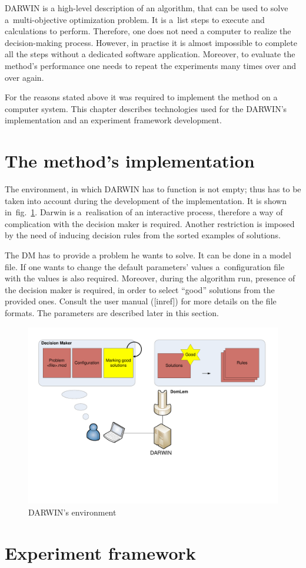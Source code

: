DARWIN is a high-level description of an algorithm, that can be used to solve
a~multi-objective optimization problem. It is a~list steps to execute and
calculations to perform. Therefore, one does not need a computer to realize
the decision-making process. However, in practise it is almost impossible to
complete all the steps without a dedicated software application. Moreover, to
evaluate the method's performance one needs to repeat the experiments many
times over and over again.

For the reasons stated above it was required to implement the method on a
computer system. This chapter describes technologies used for the DARWIN's
implementation and an experiment framework development.

\section{The method's implementation}

The environment, in which DARWIN has to function is not empty; thus has to be
taken into account during the development of the implementation. It is shown
in~fig.~\ref{environ}. Darwin is a~realisation of an interactive process,
therefore a way of complication with the decision maker is required. Another
restriction is imposed by the need of inducing decision rules from the sorted
examples of solutions.

The DM has to provide a problem he wants to solve. It can be done in a model
file. If one wants to change the default parameters' values a~configuration
file with the values is also required. Moreover, during the algorithm run,
presence of the decision maker is required, in order to select ``good''
solutions from the provided ones. Consult the user manual ([inref]) for more
details on the file formats. The parameters are described later in this
section.





\begin{figure}
  \centering \includegraphics[scale=0.5]{img/environ}
  \caption{DARWIN's environment}
  \label{environ}
\end{figure}

\section{Experiment framework}
